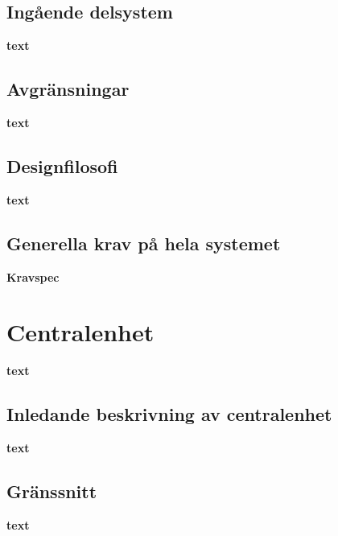 \documentclass[a4paper,titlepage,12pt]{article}
\begin{document}
	\subsection{Ingående delsystem}
	\textbf{text}
	\subsection{Avgränsningar}
	\textbf{text}
	\subsection{Designfilosofi}
	\textbf{text}
	\subsection{Generella krav på hela systemet}
	\textbf{Kravspec}

	\section{Centralenhet}
	\textbf{text}
	\subsection{Inledande beskrivning av centralenhet}
	\textbf{text}
	\subsection{Gränssnitt}
	\textbf{text}
\end{document}

